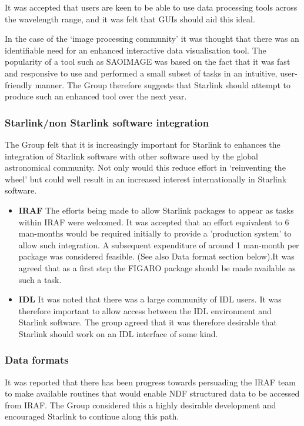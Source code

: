 It was accepted that users are keen to be able to use data processing
tools across the wavelength range, and it was felt that GUIs should
aid this ideal.

In the case of the `image processing community' it was thought that
there was an identifiable need for an enhanced interactive data
visualisation tool. The popularity of a tool such as SAOIMAGE was
based on the fact that it was fast and responsive to use and performed
a small subset of tasks in an intuitive, user-friendly manner. The
Group therefore suggests that Starlink should attempt to produce such
an enhanced tool over the next year.

\subsubsection{Starlink/non Starlink software integration}

The Group felt that it is increasingly important for Starlink to
enhances the integration of Starlink software with other software used
by the global astronomical community. Not only would this reduce
effort in `reinventing the wheel' but could well result in an
increased interest internationally in Starlink software.

\begin{itemize}
\item{\bf IRAF}
The efforts being made to allow Starlink packages to appear as tasks
within IRAF were welcomed. It was accepted that an effort equivalent
to 6 man-months would be required initially to provide a 'production
system' to allow such integration.  A subsequent expenditure of around
1 man-month per package was considered feasible. (See also Data format
section below).It was agreed that as a first step the FIGARO package
should be made available as such a task.

\item{\bf IDL}
It was noted that there was a large community of IDL users. It was
therefore important to allow access between the IDL environment and
Starlink software. The group agreed that it was therefore desirable
that Starlink should work on an IDL interface of some kind.
\end{itemize}

\subsubsection{Data formats}

It was reported that there has been progress towards persuading the
IRAF team to make available routines that would enable NDF structured
data to be accessed from IRAF. The Group considered this a highly
desirable development and encouraged Starlink to continue along this
path.

